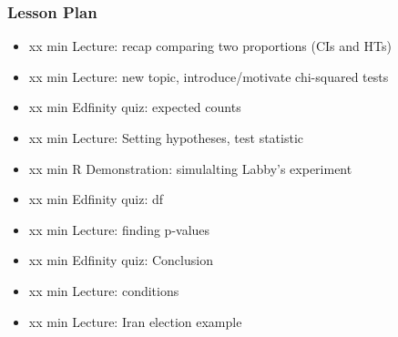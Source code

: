 \begin{frame}
    \frametitle{Lesson Plan}
    \begin{itemize}
        \item xx min Lecture: recap comparing two proportions (CIs and HTs)
        \item xx min Lecture: new topic, introduce/motivate chi-squared tests
        \item xx min Edfinity quiz: expected counts
        \item xx min Lecture: Setting hypotheses, test statistic
        \item xx min R Demonstration: simulalting Labby's experiment
        \item xx min Edfinity quiz: df
        \item xx min Lecture: finding p-values
        \item xx min Edfinity quiz: Conclusion
        \item xx min Lecture: conditions
        
        \item xx min Lecture: Iran election example
    \end{itemize}
\end{frame}
            
    


